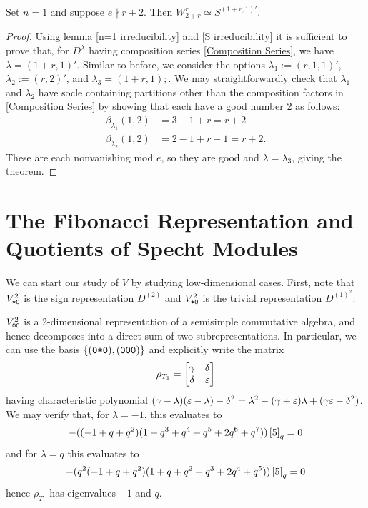 \documentclass{amsart}
\begin{document}
\begin{theorem}
  Set $n = 1$ and suppose $e \nmid r + 2$.
  Then $W_{2 + r}^r \simeq S^{(1+r,1)'}$.
\end{theorem}
\begin{proof}
  Using lemma \ref{n=1 irreducibility} and \ref{S irreducibility} it is sufficient to prove that, for $D^\lambda$ having composition series \eqref{Composition Series}, we have $\lambda = (1+r,1)'$.
  Similar to before, we consider the options $\lambda_1 := (r,1,1)'$, $\lambda_2 := (r,2)'$, and $\lambda_3 = (1+r,1);$.
  We may straightforwardly check that $\lambda_1$ and $\lambda_2$ have socle containing partitions other than the composition factors in \eqref{Composition Series} by showing that each have a good number 2 as follows:
  \begin{align*}
    \beta_{\lambda_1}(1,2) &= 3 - 1 + r = r+2\\
    \beta_{\lambda_2}(1,2) &= 2 - 1 + r + 1 = r+2.
  \end{align*}
  These are each nonvanishing mod $e$, so they are good and $\lambda = \lambda_3$, giving the theorem.
\end{proof}
\fi

\section{The Fibonacci Representation and Quotients of Specht Modules}
We can start our study of $V$ by studying low-dimensional cases.
First, note that $V_{\texttt{*}\texttt{0}}^2$ is the sign representation $D^{(2)}$ and $V_{\texttt{*}\texttt{0}}^2$ is the trivial representation $D^{(1)^2}$.

$V_{\texttt{0}\texttt{0}}^2$ is a 2-dimensional representation of a semisimple commutative algebra, and hence decomposes into a direct sum of two subrepresentations.
In particular, we can use the basis $\left\{ (\texttt{0}\texttt{*}\texttt{0}),(\texttt{0}\texttt{0}\texttt{0}) \right\}$ and explicitly write the matrix
\[
  \rho_{T_1} = \begin{bmatrix}
    \gamma & \delta\\
    \delta & \varepsilon
  \end{bmatrix}
\]
having characteristic polynomial $(\gamma - \lambda)(\varepsilon - \lambda) - \delta^2 = \lambda^2 - (\gamma + \varepsilon)\lambda +(\gamma\varepsilon - \delta^2)$.
We may verify that, for $\lambda = -1$, this evaluates to
\[
  -((-1 + q + q^2) (1 + q^3 + q^4 + q^5 + 2 q^6 + q^7))\left[ 5 \right]_q = 0
\]
and for $\lambda = q$ this evaluates to 
\[
-(q^2 (-1 + q + q^2) (1 + q + q^2 + q^3 + 2 q^4 + q^5)) \left[ 5 \right]_q = 0
\]
hence $\rho_{T_1}$ has eigenvalues $-1$ and $q$.
\end{document}
